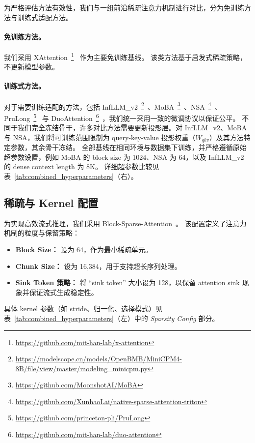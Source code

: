 为严格评估方法有效性，我们与一组前沿稀疏注意力机制进行对比，分为免训练方法与训练式适配方法。

\paragraph{免训练方法。}
我们采用 XAttention~\footnote{\url{https://github.com/mit-han-lab/x-attention}}~\citep{xattention} 作为主要免训练基线。
该类方法基于启发式稀疏策略，不更新模型参数。

\paragraph{训练式方法。}
对于需要训练适配的方法，包括 InfLLM\_v2~\footnote{\url{https://modelscope.cn/models/OpenBMB/MiniCPM4-8B/file/view/master/modeling_minicpm.py}}~\citep{infllmv2}、MoBA~\footnote{\url{https://github.com/MoonshotAI/MoBA}}~\citep{moba}、NSA~\footnote{\url{https://github.com/XunhaoLai/native-sparse-attention-triton}}~\citep{NSA}、PruLong~\footnote{\url{https://github.com/princeton-pli/PruLong}}~\citep{bhaskar2025cache} 与 DuoAttention~\footnote{\url{https://github.com/mit-han-lab/duo-attention}}~\citep{xiaoduoattention2025}，我们统一采用一致的微调协议以保证公平。
不同于我们完全冻结骨干，许多对比方法需要更新投影层。对 InfLLM\_v2、MoBA 与 NSA，我们将可训练范围限制为 query-key-value 投影权重（$W_{qkv}$）及其方法特定参数，其余骨干冻结。
全部基线在相同环境与数据集下训练，并严格遵循原始超参数设置，例如 MoBA 的 block size 为 1024、NSA 为 64，以及 InfLLM\_v2 的 dense context length 为 8K。
详细超参数比较见表~\ref{tab:combined_hyperparameters}（右）。

\subsection{稀疏与 Kernel 配置}
\label{app:sparsity_config}

为实现高效流式推理，我们采用 Block-Sparse-Attention~\citep{guo2024blocksparse}。
该配置定义了注意力机制的粒度与保留策略：
\begin{itemize}
    \item \textbf{Block Size：} 设为 64，作为最小稀疏单元。
    \item \textbf{Chunk Size：} 设为 16,384，用于支持超长序列处理。
    \item \textbf{Sink Token 策略：} 将 “sink token” 大小设为 128，以保留 attention sink 现象并保证流式生成稳定性。
\end{itemize}
具体 kernel 参数（如 stride、归一化、选择模式）见表~\ref{tab:combined_hyperparameters}（左）中的 \textit{Sparsity Config} 部分。


